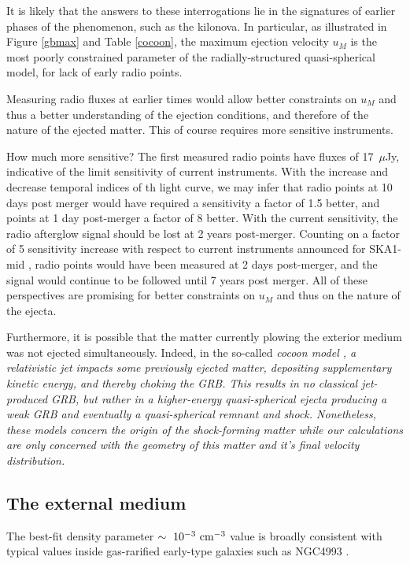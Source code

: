 It is likely that the answers to these interrogations lie in the signatures of earlier phases of the phenomenon, such as the kilonova. In particular, as illustrated in Figure \ref{gbmax} and Table \ref{cocoon}, the maximum ejection velocity $u_M$ is the most poorly constrained parameter of the radially-structured quasi-spherical model, for lack of early radio points.


Measuring radio fluxes at earlier times would allow better constraints on $u_M$ and thus a better understanding of the ejection conditions, and therefore of the nature of the ejected matter. This of course requires more sensitive instruments.

How much more sensitive? The first measured radio points have fluxes of 17~$\mu$Jy, indicative of the limit sensitivity of current instruments. With the increase and decrease temporal indices of th light curve, we may infer that radio points at 10 days post merger would have required a sensitivity a factor of 1.5 better, and points at 1 day post-merger a factor of 8 better. With the current sensitivity, the radio afterglow signal should be lost at 2 years post-merger. Counting on a factor of 5 sensitivity increase with respect to current instruments announced for SKA1-mid \citep{62}, radio points would have been measured at 2 days post-merger, and the signal would continue to be followed until 7 years post merger. All of these perspectives are promising for better constraints on $u_M$ and thus on the nature of the ejecta.

Furthermore, it is possible that the matter currently plowing the exterior medium was not ejected simultaneously. Indeed, in the so-called \it{cocoon model} \citep{42, 5}, a relativistic jet impacts some previously ejected matter, depositing supplementary kinetic energy, and thereby \it{choking} the GRB. This results in no classical jet-produced GRB, but rather in a higher-energy quasi-spherical ejecta producing a weak GRB and eventually a quasi-spherical remnant and shock. Nonetheless, these models concern the origin of the shock-forming matter while our calculations are only concerned with the geometry of this matter and it's final velocity distribution.


\subsection{The external medium}
The best-fit density parameter $\sim~10^{-3}~\rm{cm}^{-3}$ value is broadly consistent with typical values inside gas-rarified early-type galaxies such as NGC4993 \citep{44}.

